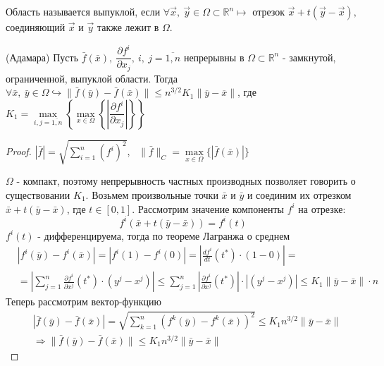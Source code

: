\begin{definition}
Область называется выпуклой, если $\forall \vec{x},~ \vec{y} \in \Omega \subset \mathbb{R}^n \mapsto$ отрезок $\vec{x} + t(\vec{y} - \vec{x}), $ соединяющий $\vec{x}$ и $\vec{y}$ также лежит в $\Omega$.
\end{definition}

\begin{lemma} (Адамара)
	Пусть $\bar{f}(\bar{x}),~ \dfrac{\partial f^i}{\partial x_j},~ i,~j = \overline{1, n}$ непрерывны в $\Omega \subset \mathbb{R}^n $ - замкнутой, ограниченной, выпуклой области. Тогда $\forall \bar{x},~\bar{y} \in \Omega  \hookrightarrow \| \bar{f}(\bar{y}) - \bar{f}(\bar{x}) \| \le n^{3/2}K_1\|\overline{y} - \overline{x}\|$, где $K_1 = \max\limits_{i,j=\overline{1,n}} \left\{\max\limits_{x\in\Omega}\left\{\left|\dfrac{\partial f^i}{\partial x_j}\right|\right\} \right\}$
\end{lemma}

\begin{proof}
	
	$|\bar{f}| = \sqrt{\sum\limits_{i=1}^n (f^i)^2}$,~ $\|\bar{f}\|_C = \max\limits_{x \in \Omega}\{|\bar{f}(\bar{x})|\}$
	
	$\Omega$ - компакт, поэтому непрерывность частных производных позволяет говорить о существовании $K_1$. Возьмем произвольные точки $\bar{x}$ и $\bar{y}$ и соединим их отрезком $\bar{x} + t(\bar{y} - \bar{x})$, где $t\in[0, 1]$. Рассмотрим значение компоненты $f^i$ на отрезке:
	\[
		f^i(\bar{x} + t(\bar{y} - \bar{x})) = f^i(t)
	\]
	$f^i(t)$ - дифференцируема, тогда по теореме Лагранжа о среднем
	\begin{align*}
		&|f^i(\bar{y}) - f^i(\bar{x})| = |f^i(1) - f^i(0)| = \left| \frac{df^i}{dt}(t^*)\cdot(1-0)\right| = \\
		&= \left|\sum\limits_{j=1}^n\frac{\partial f^i}{\partial x^j}(t^*)\cdot(y^j - x^j)\right| \le \sum\limits_{j=1}^n\left|\frac{\partial f^i}{\partial x^j}(t^*)\right|\cdot\left|(y^j - x^j)\right| \le K_1\|\bar{y}-\bar{x}\|\cdot n
	\end{align*}
	Теперь рассмотрим вектор-функцию
	\begin{align*}
		&|\bar{f}(\bar{y}) - \bar{f}(\bar{x})| = \sqrt{\sum\limits_{k=1}^n (f^k(\bar{y}) - f^k(\bar{x}))^2} \le K_1n^{3/2}\|\bar{y}-\bar{x}\| \\
		&\Rightarrow \|\bar{f}(\bar{y}) - \bar{f}(\bar{x})\| \le K_1n^{3/2}\|\bar{y}-\bar{x}\|
	\end{align*}
\end{proof}

